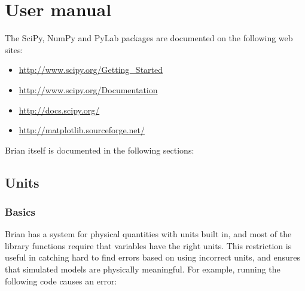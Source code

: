 \documentclass[letterpaper,10pt,english]{manual}
\begin{document}
\resetcurrentobjects
\hypertarget{--doc-usermanual}{}

\hypertarget{user-manual}{}\chapter{User manual}
The SciPy, NumPy and PyLab packages are documented on the following web sites:
\begin{itemize}
\item {} 
\href{http://www.scipy.org/Getting\_Started}{http://www.scipy.org/Getting\_Started}

\item {} 
\href{http://www.scipy.org/Documentation}{http://www.scipy.org/Documentation}

\item {} 
\href{http://docs.scipy.org/}{http://docs.scipy.org/}

\item {} 
\href{http://matplotlib.sourceforge.net/}{http://matplotlib.sourceforge.net/}

\end{itemize}

Brian itself is documented in the following sections:

\resetcurrentobjects
\hypertarget{--doc-units}{}

\section{Units}


\subsection{Basics}

Brian has a system for physical quantities with units built in, and most of the
library functions require that variables have the right units. This restriction
is useful in catching hard to find errors based on using incorrect units, and
ensures that simulated models are physically meaningful. For example, running
the following code causes an error:
\end{document}
